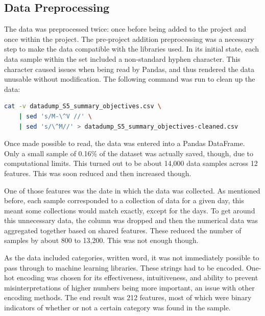 \documentclass[12pt]{article}
\begin{document}
\newpage

\subsection{Data Preprocessing}
The data was preprocessed twice: once before being added to the project and once within the project.
The pre-project addition preprocessing was a necessary step to make the data compatible with the libraries used.
In its initial state, each data sample within the set included a non-standard hyphen character.
This character caused issues when being read by Pandas, and thus rendered the data unusable without modification.
The following command was run to clean up the data:
\begin{lstlisting}[language=Bash]
	cat -v datadump_S5_summary_objectives.csv \
	| sed 's/M-\^V //' \
	| sed 's/\^M//' > datadump_S5_summary_objectives-cleaned.csv
\end{lstlisting}

Once made possible to read, the data was entered into a Pandas DataFrame.
Only a small sample of 0.16\% of the dataset was actually saved, though, due to computational limits.
This turned out to be about 14,000 data samples across 12 features.
This was soon reduced and then increased though.

One of those features was the date in which the data was collected.
As mentioned before, each sample corresponded to a collection of data for a given day, this meant some collections would match exactly, except for the days.
To get around this unnecessary data, the column was dropped and then the numerical data was aggregated together based on shared features.
These reduced the number of samples by about 800 to 13,200.
This was not enough though.

As the data included categories, written word, it was not immediately possible to pass through to machine learning libraries.
These strings had to be encoded.
One-hot encoding was chosen for its effectiveness, intuitiveness, and ability to prevent misinterpretations of higher numbers being more important, an issue with other encoding methods.
The end result was 212 features, most of which were binary indicators of whether or not a certain category was found in the sample.

\newpage


\end{document}
